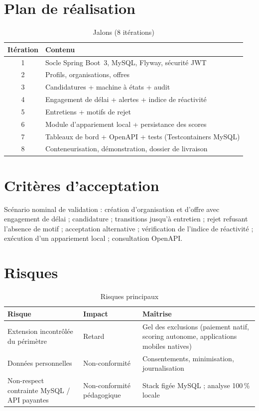 \documentclass[12pt,a4paper,oneside]{report}
\begin{document}
\chapter{Plan de réalisation}
\label{ch:plan}

\begin{table}[H]
\centering
\caption{Jalons (8 itérations)}
\begin{tabularx}{\textwidth}{@{}cX@{}}
\toprule
\textbf{Itération} & \textbf{Contenu} \\
\midrule
1 & Socle Spring Boot~3, MySQL, Flyway, sécurité JWT \\
2 & Profils, organisations, offres \\
3 & Candidatures + machine à états + audit \\
4 & Engagement de délai + alertes + indice de réactivité \\
5 & Entretiens + motifs de rejet \\
6 & Module d'appariement local + persistance des scores \\
7 & Tableaux de bord + OpenAPI + tests (Testcontainers MySQL) \\
8 & Conteneurisation, démonstration, dossier de livraison \\
\bottomrule
\end{tabularx}
\end{table}

\chapter{Critères d'acceptation}
\label{ch:accept}

Scénario nominal de validation : création d'organisation et d'offre avec engagement de délai ; candidature ; transitions jusqu'à entretien ; rejet refusant l'absence de motif ; acceptation alternative ; vérification de l'indice de réactivité ; exécution d'un appariement local ; consultation OpenAPI.

\chapter{Risques}
\label{ch:risques}

\begin{table}[H]
\centering
\caption{Risques principaux}
\begin{tabularx}{\textwidth}{@{}lXX@{}}
\toprule
\textbf{Risque} & \textbf{Impact} & \textbf{Maîtrise} \\
\midrule
Extension incontrôlée du périmètre & Retard & Gel des exclusions (paiement natif, scoring autonome, applications mobiles natives) \\
Données personnelles & Non-conformité & Consentements, minimisation, journalisation \\
Non-respect contrainte MySQL / API payantes & Non-conformité pédagogique & Stack figée MySQL ; analyse 100\,\% locale \\
\bottomrule
\end{tabularx}
\end{table}
\end{document}
